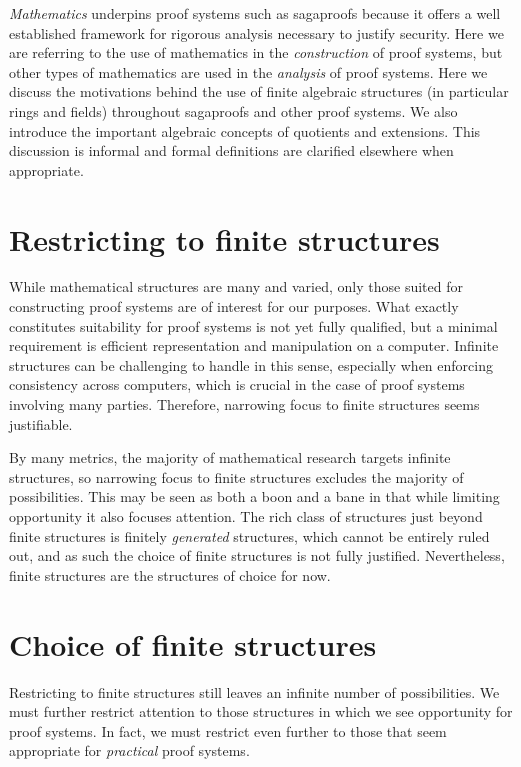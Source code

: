  
\emph{Mathematics} underpins proof systems such as sagaproofs because it offers a well established framework for rigorous analysis necessary to justify security.
Here we are referring to the use of mathematics in the \emph{construction} of proof systems, but other types of mathematics are used in the \emph{analysis} of proof systems.
Here we discuss the motivations behind the use of finite algebraic structures (in particular rings and fields) throughout sagaproofs and other proof systems.
We also introduce the important algebraic concepts of quotients and extensions.
This discussion is informal and formal definitions are clarified elsewhere when appropriate.


\section{Restricting to finite structures}

While mathematical structures are many and varied, only those suited for constructing proof systems are of interest for our purposes.
What exactly constitutes suitability for proof systems is not yet fully qualified, but a minimal requirement is efficient representation and manipulation on a computer.
Infinite structures can be challenging to handle in this sense, especially when enforcing consistency across computers, which is crucial in the case of proof systems involving many parties.
Therefore, narrowing focus to finite structures seems justifiable.

By many metrics, the majority of mathematical research targets infinite structures, so narrowing focus to finite structures excludes the majority of possibilities.
This may be seen as both a boon and a bane in that while limiting opportunity it also focuses attention.
The rich class of structures just beyond finite structures is finitely \emph{generated} structures, which cannot be entirely ruled out, and as such the choice of finite structures is not fully justified.
Nevertheless, finite structures are the structures of choice for now.


\section{Choice of finite structures}

Restricting to finite structures still leaves an infinite number of possibilities.
We must further restrict attention to those structures in which we see opportunity for proof systems.
In fact, we must restrict even further to those that seem appropriate for \emph{practical} proof systems.

